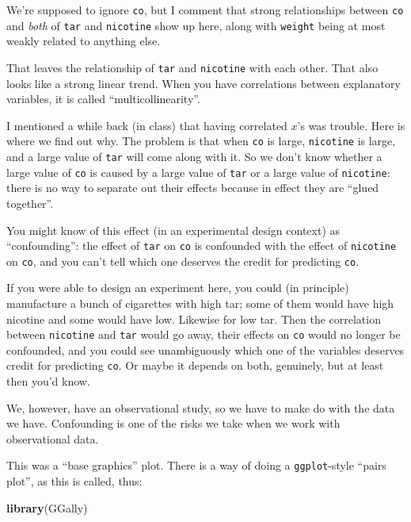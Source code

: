 \documentclass[]{tufte-book}
\newenvironment{Shaded}{}{}
\newcommand{\KeywordTok}[1]{\textcolor[rgb]{0.00,0.44,0.13}{\textbf{#1}}}
\newcommand{\NormalTok}[1]{#1}
\theoremstyle{definition}
\theoremstyle{definition}
\theoremstyle{definition}
\theoremstyle{remark}
\begin{document}
We're supposed to ignore \texttt{co}, but I comment that strong
relationships between \texttt{co} and \emph{both} of \texttt{tar} and
\texttt{nicotine} show up here, along with \texttt{weight} being at most
weakly related to anything else.

That leaves the relationship of \texttt{tar} and \texttt{nicotine} with
each other. That also looks like a strong linear trend. When you have
correlations between explanatory variables, it is called
``multicollinearity''.

I mentioned a while back (in class) that having correlated \(x\)'s was
trouble. Here is where we find out why. The problem is that when
\texttt{co} is large, \texttt{nicotine} is large, and a large value of
\texttt{tar} will come along with it. So we don't know whether a large
value of \texttt{co} is caused by a large value of \texttt{tar} or a
large value of \texttt{nicotine}: there is no way to separate out their
effects because in effect they are ``glued together''.

You might know of this effect (in an experimental design context) as
``confounding'': the effect of \texttt{tar} on \texttt{co} is confounded
with the effect of \texttt{nicotine} on \texttt{co}, and you can't tell
which one deserves the credit for predicting \texttt{co}.

If you were able to design an experiment here, you could (in principle)
manufacture a bunch of cigarettes with high tar; some of them would have
high nicotine and some would have low. Likewise for low tar. Then the
correlation between \texttt{nicotine} and \texttt{tar} would go away,
their effects on \texttt{co} would no longer be confounded, and you
could see unambiguously which one of the variables deserves credit for
predicting \texttt{co}. Or maybe it depends on both, genuinely, but at
least then you'd know.

We, however, have an observational study, so we have to make do with the
data we have. Confounding is one of the risks we take when we work with
observational data.

This was a ``base graphics'' plot. There is a way of doing a
\texttt{ggplot}-style ``pairs plot'', as this is called, thus:

\begin{Shaded}
\begin{Highlighting}[]
\KeywordTok{library}\NormalTok{(GGally)}
\end{Highlighting}
\end{Shaded}
\end{document}
